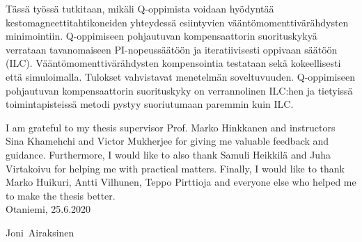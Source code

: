 \documentclass[english, 12pt, a4paper, elec, utf8, a-2b, online]{aaltothesis}
\begin{document}
\newpage

\begin{abstractpage}[finnish]
Tässä työssä tutkitaan, mikäli Q-oppimista voidaan hyödyntää kestomagneettitahtikoneiden yhteydessä esiintyvien vääntömomenttivärähdysten minimointiin. Q-oppimiseen pohjautuvan kompensaattorin suorituskykyä verrataan tavanomaiseen PI-nopeussäätöön ja iteratiivisesti oppivaan säätöön (ILC). Vääntömomenttivärähdysten kompensointia testataan sekä kokeellisesti että simuloimalla. Tulokset vahvistavat menetelmän soveltuvuuden. Q-oppimiseen pohjautuvan kompensaattorin suorituskyky on verrannolinen ILC:hen ja tietyissä toimintapisteissä metodi pystyy suoriutumaan paremmin kuin ILC.
\end{abstractpage}

\newpage


I am grateful to my thesis supervisor Prof. Marko Hinkkanen and instructors Sina Khamehchi and Victor Mukherjee for giving me valuable feedback and guidance. Furthermore, I would like to also thank Samuli Heikkilä and Juha Virtakoivu for helping me with practical matters. Finally, I would like to thank Marko Huikuri, Antti Vilhunen, Teppo Pirttioja and everyone else who helped me to make the thesis better.\\

\vspace{5cm}
Otaniemi, 25.6.2020

\vspace{5mm}
{\hfill Joni\ Airaksinen \hspace{1cm}}

\newpage

\thesistableofcontents
\end{document}
